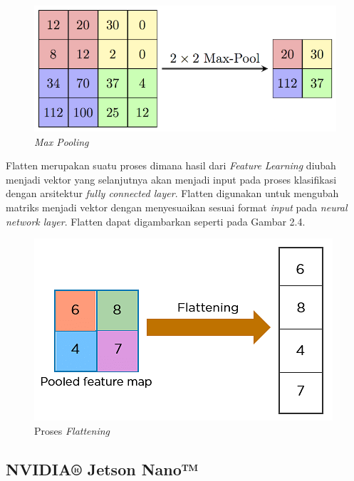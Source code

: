 \begin{figure} [ht] \centering
    \includegraphics[scale=1.5]{gambar/maxPooling.png}
    \caption{\emph{Max Pooling}}
    \label{fig:Max Pooling}
\end{figure}

Flatten merupakan suatu proses dimana hasil dari \emph{Feature Learning} diubah menjadi vektor yang selanjutnya akan menjadi input pada proses klasifikasi dengan arsitektur \emph{fully connected layer}. Flatten digunakan untuk mengubah matriks menjadi vektor dengan menyesuaikan sesuai format \emph{input} pada \emph{neural network layer}. Flatten dapat digambarkan seperti pada Gambar 2.4.

\begin{figure} [ht] \centering
    \includegraphics[scale=0.6]{gambar/flattening.png}
    \caption{Proses \emph{Flattening}}
    \label{fig:Proses Flattening}
\end{figure}

\newpage

\subsection{NVIDIA® Jetson Nano™}

